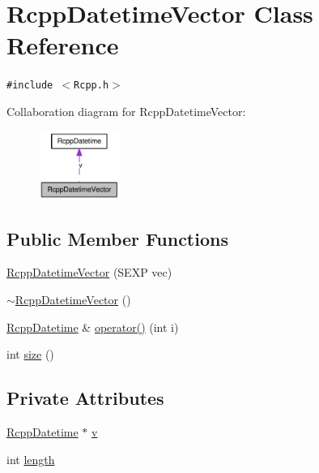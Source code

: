 \hypertarget{classRcppDatetimeVector}{
\section{RcppDatetimeVector Class Reference}
\label{classRcppDatetimeVector}
}
{\tt \#include $<$Rcpp.h$>$}

Collaboration diagram for RcppDatetimeVector:\nopagebreak
\begin{figure}[H]
\begin{center}
\leavevmode
\includegraphics[width=75pt]{classRcppDatetimeVector__coll__graph}
\end{center}
\end{figure}
\subsection*{Public Member Functions}
\begin{CompactItemize}
\item 
\hyperlink{classRcppDatetimeVector_1c1d1e2087fdc8e7601299dc2c4fe24c}{RcppDatetimeVector} (SEXP vec)
\item 
\hyperlink{classRcppDatetimeVector_81d6c5daba7448058a2f896841ddeb3a}{$\sim$RcppDatetimeVector} ()
\item 
\hyperlink{classRcppDatetime}{RcppDatetime} \& \hyperlink{classRcppDatetimeVector_2ffa33b5231a7975652e1e2498d0e16a}{operator()} (int i)
\item 
int \hyperlink{classRcppDatetimeVector_8ca7268098fb2b9250523c4e2ef3c8b7}{size} ()
\end{CompactItemize}
\subsection*{Private Attributes}
\begin{CompactItemize}
\item 
\hyperlink{classRcppDatetime}{RcppDatetime} $\ast$ \hyperlink{classRcppDatetimeVector_0138476000351892e9ec591b2c9ec02f}{v}
\item 
int \hyperlink{classRcppDatetimeVector_e131031fcf2e65b7bfeee3d8e25c4f8c}{length}
\end{CompactItemize}


